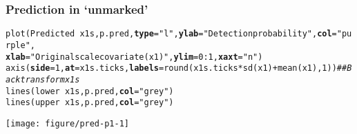\documentclass[color=usenames,dvipsnames]{beamer}\usepackage[]{graphicx}\usepackage[]{color}
\makeatletter
\newcommand{\hlnum}[1]{\textcolor[rgb]{0.69,0.494,0}{#1}}%
\newcommand{\hlstr}[1]{\textcolor[rgb]{0.749,0.012,0.012}{#1}}%
\newcommand{\hlcom}[1]{\textcolor[rgb]{0.514,0.506,0.514}{\textit{#1}}}%
\newcommand{\hlopt}[1]{\textcolor[rgb]{0,0,0}{#1}}%
\newcommand{\hlstd}[1]{\textcolor[rgb]{0,0,0}{#1}}%
\newcommand{\hlkwc}[1]{\textcolor[rgb]{0,0,0}{\textbf{#1}}}%
\newcommand{\hlkwd}[1]{\textcolor[rgb]{0.004,0.004,0.506}{#1}}%
\newenvironment{kframe}{%
 \def\at@end@of@kframe{}%
 \ifinner\ifhmode%
  \def\at@end@of@kframe{\end{minipage}}%
  \begin{minipage}{\columnwidth}%
 \fi\fi%
 \def\FrameCommand##1{\hskip\@totalleftmargin \hskip-\fboxsep
 \colorbox{shadecolor}{##1}\hskip-\fboxsep
     \hskip-\linewidth \hskip-\@totalleftmargin \hskip\columnwidth}%
 \MakeFramed {\advance\hsize-\width
   \@totalleftmargin\z@ \linewidth\hsize
   \@setminipage}}%
 {\par\unskip\endMakeFramed%
 \at@end@of@kframe}
\newenvironment{knitrout}{}{} %
\makeatother
\begin{document}
\begin{frame}[fragile]
  \frametitle{Prediction in `unmarked'}
\begin{knitrout}\tiny
{}\color{fgcolor}\begin{kframe}
\begin{alltt}
\hlkwd{plot}\hlstd{(Predicted} \hlopt{~} \hlstd{x1s, p.pred,} \hlkwc{type}\hlstd{=}\hlstr{"l"}\hlstd{,} \hlkwc{ylab}\hlstd{=}\hlstr{"Detection probability"}\hlstd{,} \hlkwc{col}\hlstd{=}\hlstr{"purple"}\hlstd{,}
     \hlkwc{xlab}\hlstd{=}\hlstr{"Original scale covariate (x1)"}\hlstd{,} \hlkwc{ylim}\hlstd{=}\hlnum{0}\hlopt{:}\hlnum{1}\hlstd{,} \hlkwc{xaxt}\hlstd{=}\hlstr{"n"}\hlstd{)}
\hlkwd{axis}\hlstd{(}\hlkwc{side}\hlstd{=}\hlnum{1}\hlstd{,} \hlkwc{at}\hlstd{=x1s.ticks,} \hlkwc{labels}\hlstd{=}\hlkwd{round}\hlstd{(x1s.ticks}\hlopt{*}\hlkwd{sd}\hlstd{(x1)}\hlopt{+}\hlkwd{mean}\hlstd{(x1),}\hlnum{1}\hlstd{))} \hlcom{## Backtransform x1s}
\hlkwd{lines}\hlstd{(lower} \hlopt{~} \hlstd{x1s, p.pred,} \hlkwc{col}\hlstd{=}\hlstr{"grey"}\hlstd{)}
\hlkwd{lines}\hlstd{(upper} \hlopt{~} \hlstd{x1s, p.pred,} \hlkwc{col}\hlstd{=}\hlstr{"grey"}\hlstd{)}
\end{alltt}
\end{kframe}

{\centering \texttt{[image: figure/pred-p1-1]} 

}



\end{knitrout}
\end{frame}


\end{document}
